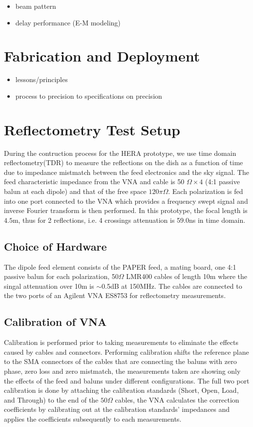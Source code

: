 \documentclass[preprint]{aastex}  %
\begin{document}
\begin{itemize}
\item beam pattern
\item delay performance (E-M modeling)
\end{itemize}

\section{Fabrication and Deployment}
\label{sec:deploy}

\begin{itemize}
\item lessons/principles
\item process to precision to specifications on precision
\end{itemize}


\section{Reflectometry Test Setup}
\label{sec:reflect}
During the contruction process for the HERA prototype, we use time domain reflectometry(TDR) to measure the reflections on the dish as a function of time due to impedance mistmatch between the feed electronics and the sky signal. The feed characteristic impedance from the VNA and cable is 50 $\Omega\times 4$ (4:1 passive balun at each dipole) and that of the free space $120\pi\Omega$. Each polarization is fed into one port connected to the VNA which provides a frequency swept signal and inverse Fourier transform is then performed.  In this prototype, the focal length is $4.5$m, thus for 2 reflections, i.e. 4 crossings attenuation is 59.0ns in time domain.


\subsection{Choice of Hardware}
The dipole feed element consists of the PAPER feed, a mating board, one 4:1 passive balun for each polarization, 50$\Omega$ LMR400 cables of length 10m where the singal attenuation over 10m is $\sim$0.5dB at 150MHz. 
The cables are connected to the two ports of an Agilent VNA ES8753 for reflectometry measurements. 


\subsection{Calibration of VNA}
Calibration is performed prior to taking measurements to eliminate the effects caused by cables and connectors. Performing calibration shifts the reference plane to the SMA connectors of the cables that are connecting the baluns with zero phase, zero loss and zero mistmatch, the measurements taken are showing only the effects of the feed and baluns under different configurations. The full two port calibration is done by attaching the calibration standards (Short, Open, Load, and Through) to the end of the $50\Omega$ cables, the VNA calculates the correction coefficients by calibrating out at the calibration standards' impedances and applies the coefficients subsequently to each measurements.
\end{document}
